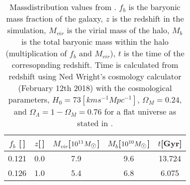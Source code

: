 \begin{table}[h]
  \centering
  \begin{tabular}{|c|c|c|c|c|}
    \hline
    $f_b$ [\,] & $z$[\,] & $M_{vir}$[$10^{11}\msol$] & $M_b$[$10^{10}\msol$] & $t$[Gyr] \\
    \hline
    0.121 & 0.0 & 7.9 & 9.6 & 13.724 \\
    0.126 & 1.0 & 5.4 & 6.8 & 6.075 \\
    \hline
  \end{tabular}
  \caption[Mass data \eris]{\label{tab:guedes11-baryonic-mass}
    Massdistribution values from . $f_b$ is the baryonic mass fraction of the galaxy, $z$ is the redshift in the simulation, $M_{vir}$ is the virial mass of the halo, $M_b$ is the total baryonic mass within the halo (multiplication of $f_b$ and $M_{vir}$), $t$ is the time of the corresopnding redshift.
    Time is calculated from redshift using Ned Wright's cosmology calculator (February 12th 2018)  with the cosmological parameters, $H_0=73[km s^{-1} Mpc^{-1}]$, $\Omega_M=0.24$, and $\Omega_\Lambda=1-\Omega_M=0.76$ for a flat universe as stated in .}
\end{table}
